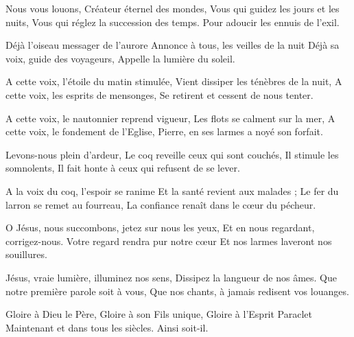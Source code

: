 Nous vous louons, Créateur éternel des mondes,
Vous qui guidez les jours et les nuits,
Vous qui réglez la succession des temps.
Pour adoucir les ennuis de l'exil.

Déjà l'oiseau messager de l'aurore
Annonce à tous, les veilles de la nuit
Déjà sa voix, guide des voyageurs,
Appelle la lumière du soleil.

A cette voix, l'étoile du matin stimulée,
Vient dissiper les ténèbres de la nuit,
A cette voix, les esprits de mensonges,
Se retirent et cessent de nous tenter.

A cette voix, le nautonnier reprend vigueur,
Les flots se calment sur la mer,
A cette voix, le fondement de l'Eglise,
Pierre, en ses larmes a noyé son forfait.

Levons-nous plein d'ardeur,
Le coq reveille ceux qui sont couchés,
Il stimule les somnolents,
Il fait honte à ceux qui refusent de se lever.

A la voix du coq, l'espoir se ranime
Et la santé revient aux malades ;
Le fer du larron se remet au fourreau,
La confiance renaît dans le cœur du pécheur.

O Jésus, nous succombons, jetez sur nous les yeux,
Et en nous regardant, corrigez-nous.
Votre regard rendra pur notre cœur
Et nos larmes laveront nos souillures.

Jésus, vraie lumière, illuminez nos sens,
Dissipez la langueur de nos âmes.
Que notre première parole soit à vous,
Que nos chants, à jamais redisent vos louanges.

Gloire à Dieu le Père,
Gloire à son Fils unique,
Gloire à l'Esprit Paraclet
Maintenant et dans tous les siècles.
Ainsi soit-il.